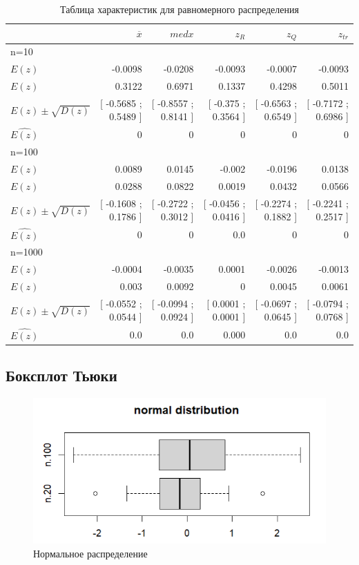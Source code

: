\documentclass[a4paper,14pt]{article}
\begin{document}
	\begin{table}[H]
		\centering
		\begin{tabular}[t]{|l|r|r|r|r|r|}
			\hline
			& $\overline{x}$ & $med x$ & $z_R$ & $z_Q$ & $z_{tr}$\\\hline\hline
			n=10 & & & & &\\\hline
			$E(z)$  & -0.0098 & -0.0208 & -0.0093 & -0.0007 & -0.0093  \\\hline
$E(z)$  & 0.3122 & 0.6971 & 0.1337 & 0.4298 & 0.5011  \\\hline
$E(z)  \pm  \sqrt{D(z)}$  & [ -0.5685 ; 0.5489 ] & [ -0.8557 ; 0.8141 ] & [ -0.375 ; 0.3564 ] & [ -0.6563 ; 0.6549 ] & [ -0.7172 ; 0.6986 ]  \\\hline
			$\hat{E(z)}$ & 0 & 0 & 0 & 0 & 0\\\hline
			
			n=100 & & & & &\\\hline
			$E(z)$  & 0.0089 & 0.0145 & -0.002 & -0.0196 & 0.0138  \\\hline
$E(z)$  & 0.0288 & 0.0822 & 0.0019 & 0.0432 & 0.0566  \\\hline
$E(z)  \pm  \sqrt{D(z)}$  & [ -0.1608 ; 0.1786 ] & [ -0.2722 ; 0.3012 ] & [ -0.0456 ; 0.0416 ] & [ -0.2274 ; 0.1882 ] & [ -0.2241 ; 0.2517 ]  \\\hline
			$\hat{E(z)}$ & 0 & 0 & 0.0 & 0 & 0\\\hline
			
			n=1000 & & & & &\\\hline
			$E(z)$  & -0.0004 & -0.0035 & 0.0001 & -0.0026 & -0.0013  \\\hline
$E(z)$  & 0.003 & 0.0092 & 0 & 0.0045 & 0.0061  \\\hline
$E(z)  \pm  \sqrt{D(z)}$  & [ -0.0552 ; 0.0544 ] & [ -0.0994 ; 0.0924 ] & [ 0.0001 ; 0.0001 ] & [ -0.0697 ; 0.0645 ] & [ -0.0794 ; 0.0768 ]  \\\hline
			$\hat{E(z)}$ & 0.0 & 0.0 & 0.000 & 0.0 & 0.0\\\hline
			
		\end{tabular}
		\caption{Таблица характеристик для равномерного распределения}
		\label{tab:uniform}
	\end{table}
	\subsection{Боксплот Тьюки}
	\begin{figure}[H]
		\centering
		\includegraphics[scale=0.9]{./lab1_3/pictures/boxplot rnorm.PNG}
		\caption{Нормальное распределение}
		\label{fig:normal}
	\end{figure}
	
\end{document}
